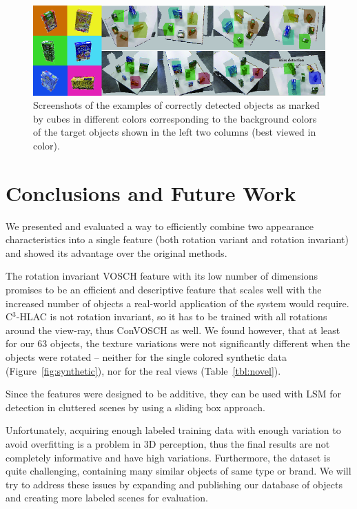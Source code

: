 \documentclass[a4paper, 10 pt, conference]{sty/ieeeconf}
\begin{document}
\begin{figure}[tb!]
  \centering
  \includegraphics[width=.99\textwidth]{figures/detection_demo/four_objects_detection.png}
  \caption{Screenshots of the examples of correctly detected objects as marked by cubes in different colors corresponding to the background colors of the target objects shown in the left two columns (best viewed in color). }
  \label{fig:correct_detected}
\end{figure}



\section{Conclusions and Future Work}
\label{sec:conclusion}

We presented and evaluated a way to efficiently combine two
appearance characteristics into a single feature (both rotation
variant and rotation invariant) and showed its advantage over
the original methods.

The rotation invariant VOSCH feature with its low number of dimensions
promises to be an efficient and descriptive feature that scales well with
the increased number of objects a real-world application of the system would
require. C$^3$-HLAC is not rotation invariant, so it has to be trained with
all rotations around the view-ray, thus ConVOSCH as well. We found
however, that at least for our 63 objects, the texture variations
were not significantly different when the objects were rotated
-- neither for the single colored synthetic data (Figure~\ref{fig:synthetic}),
nor for the real views (Table~\ref{tbl:novel}).

Since the features were designed to be additive, they can be used with LSM for
detection in cluttered scenes by using a sliding box approach.

Unfortunately, acquiring enough labeled training data with enough variation
to avoid overfitting is a problem in 3D perception, thus the final results are
not completely informative and have high variations.
Furthermore, the dataset is quite challenging, containing many similar objects of same type or brand.
We will try to address these issues by expanding and publishing our database of objects
and creating more labeled scenes for evaluation.
\end{document}
